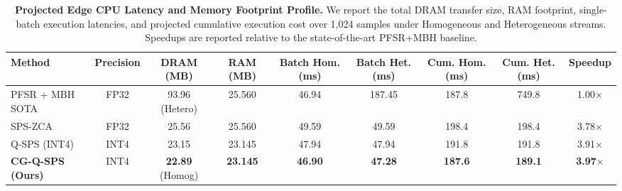 \begin{table}[t]
\caption{\textbf{Projected Edge CPU Latency and Memory Footprint Profile.} We report the total DRAM transfer size, RAM footprint, single-batch execution latencies, and projected cumulative execution cost over 1,024 samples under Homogeneous and Heterogeneous streams. Speedups are reported relative to the state-of-the-art PFSR+MBH baseline.}
\label{tab:latency_profile}
\vskip 0.15in
\begin{center}
\begin{scriptsize}
\begin{sc}
\setlength{\tabcolsep}{1.2pt}
\begin{tabular}{lcccccccc}
\toprule
Method & Precision & DRAM (MB) & RAM (MB) & Batch Hom. (ms) & Batch Het. (ms) & Cum. Hom. (ms) & Cum. Het. (ms) & Speedup \\
\midrule
PFSR + MBH SOTA & FP32 & 93.96 (Hetero) & 25.560 & 46.94 & 187.45 & 187.8 & 749.8 & 1.00$\times$ \\
SPS-ZCA & FP32 & 25.56 & 25.560 & 49.59 & 49.59 & 198.4 & 198.4 & 3.78$\times$ \\
Q-SPS (INT4) & INT4 & 23.15 & 23.145 & 47.94 & 47.94 & 191.8 & 191.8 & 3.91$\times$ \\
\textbf{CG-Q-SPS (Ours)} & INT4 & \textbf{22.89} (Homog) & \textbf{23.145} & \textbf{46.90} & \textbf{47.28} & \textbf{187.6} & \textbf{189.1} & \textbf{3.97$\times$} \\
\bottomrule
\end{tabular}
\end{sc}
\end{scriptsize}
\end{center}
\vskip -0.1in
\end{table}

